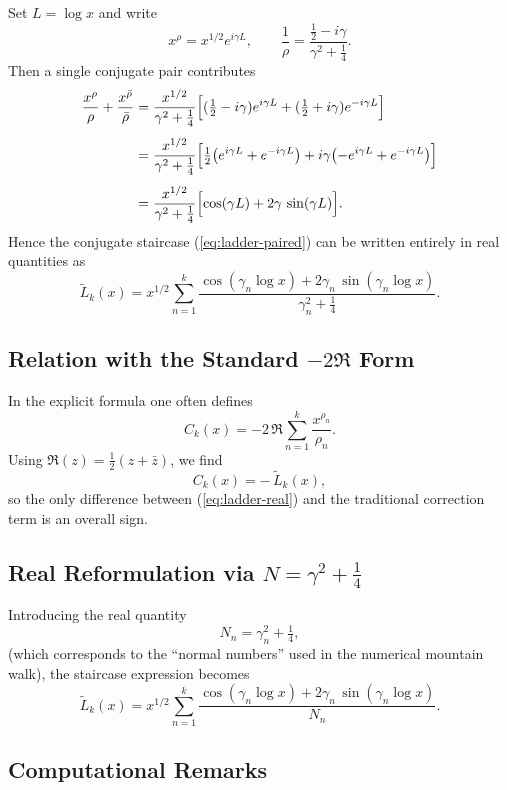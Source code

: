\documentclass[11pt,a4paper]{article}
\begin{document}
Set $L=\log x$ and write
\[
x^{\rho} = x^{1/2}e^{i\gamma L},
\qquad
\frac{1}{\rho} = \frac{\tfrac12 - i\gamma}{\gamma^2 + \tfrac14}.
\]
Then a single conjugate pair contributes
\begin{align*}
\frac{x^{\rho}}{\rho}+\frac{x^{\bar\rho}}{\bar\rho}
&=
\frac{x^{1/2}}{\gamma^2+\tfrac14}
\Bigl[
(\tfrac12 - i\gamma)e^{i\gamma L}
+(\tfrac12 + i\gamma)e^{-i\gamma L}
\Bigr]\\[4pt]
&=
\frac{x^{1/2}}{\gamma^2+\tfrac14}
\Bigl[
\tfrac12\bigl(e^{i\gamma L}+e^{-i\gamma L}\bigr)
+i\gamma\bigl(-e^{i\gamma L}+e^{-i\gamma L}\bigr)
\Bigr]\\[4pt]
&=
\frac{x^{1/2}}{\gamma^2+\tfrac14}
\Bigl[
\cos(\gamma L)
+2\gamma\,\sin(\gamma L)
\Bigr].
\end{align*}
Hence the conjugate staircase (\ref{eq:ladder-paired}) can be written
entirely in real quantities as
\begin{equation}
\boxed{
\widetilde{L}_k(x)
=
x^{1/2}
\sum_{n=1}^{k}
\frac{
\cos(\gamma_n\log x)
+2\gamma_n\,\sin(\gamma_n\log x)
}{
\gamma_n^2+\tfrac14
}.
}
\label{eq:ladder-real}
\end{equation}

\subsection*{Relation with the Standard $-2\Re$ Form}

In the explicit formula one often defines
\[
C_k(x) = -2\,\Re\sum_{n=1}^{k}\frac{x^{\rho_n}}{\rho_n}.
\]
Using $\Re(z) = \tfrac12(z+\bar z)$, we find
\[
C_k(x) = -\,\widetilde{L}_k(x),
\]
so the only difference between (\ref{eq:ladder-real})
and the traditional correction term is an overall sign.

\subsection*{Real Reformulation via $N=\gamma^2+\tfrac14$}

Introducing the real quantity
\[
N_n = \gamma_n^2 + \tfrac14,
\]
(which corresponds to the ``normal numbers'' used in the numerical
mountain walk), the staircase expression becomes
\begin{equation}
\boxed{
\widetilde{L}_k(x)
=
x^{1/2}
\sum_{n=1}^{k}
\frac{
\cos(\gamma_n\log x)
+2\gamma_n\,\sin(\gamma_n\log x)
}{N_n}.
}
\label{eq:ladder-N}
\end{equation}

\subsection*{Computational Remarks}
\end{document}
